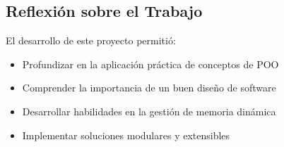 \documentclass[12pt]{article}
\begin{document}
\subsection{Reflexi\'on sobre el Trabajo}
El desarrollo de este proyecto permiti\'o:
\begin{itemize}
    \item Profundizar en la aplicaci\'on pr\'actica de conceptos de POO
    \item Comprender la importancia de un buen dise\~no de software
    \item Desarrollar habilidades en la gesti\'on de memoria din\'amica
    \item Implementar soluciones modulares y extensibles
\end{itemize}
\end{document}
